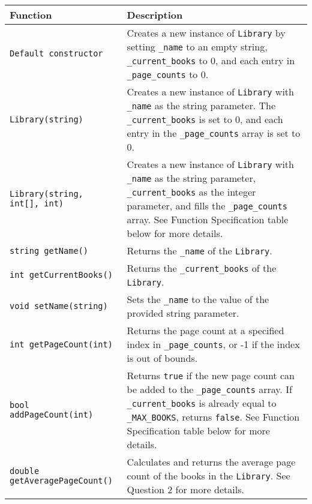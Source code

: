 \renewcommand{\arraystretch}{1.5} 
\begin{longtable}{|p{2.0in}|p{4.0in}|}
\hline
\textbf{Function} & \textbf{Description} \\ \hline

\texttt{Default constructor} & Creates a new instance of \texttt{Library} by setting \texttt{_name} to an empty string, \texttt{_current_books} to 0, and each entry in \texttt{_page_counts} to 0. \\ \hline

\texttt{Library(string)} & Creates a new instance of \texttt{Library} with \texttt{_name} as the string parameter. The \texttt{_current_books} is set to 0, and each entry in the \texttt{_page_counts} array is set to 0. \\ \hline

\texttt{Library(string, int[], int)} & Creates a new instance of \texttt{Library} with \texttt{_name} as the string parameter, \texttt{_current_books} as the integer parameter, and fills the \texttt{_page_counts} array. See Function Specification table below for more details. \\ \hline

\texttt{string getName()} & Returns the \texttt{_name} of the \texttt{Library}. \\ \hline

\texttt{int getCurrentBooks()} & Returns the \texttt{_current_books} of the \texttt{Library}. \\ \hline

\texttt{void setName(string)} & Sets the \texttt{_name} to the value of the provided string parameter. \\ \hline

\texttt{int getPageCount(int)} & Returns the page count at a specified index in \texttt{_page_counts}, or -1 if the index is out of bounds. \\ \hline

\texttt{bool addPageCount(int)} & Returns \texttt{true} if the new page count can be added to the \texttt{_page_counts} array. If \texttt{_current_books} is already equal to \texttt{_MAX_BOOKS}, returns \texttt{false}. See Function Specification table below for more details. \\ \hline

\texttt{double getAveragePageCount()} & Calculates and returns the average page count of the books in the \texttt{Library}. See Question 2 for more details. \\ \hline

\end{longtable}


